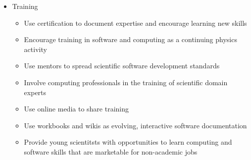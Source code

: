 \begin{itemize}
    \item Training
    \begin{itemize}
        \item Use certification to document expertise and encourage learning new skills
        \item Encourage training in software and computing as a continuing physics activity
        \item Use mentors to spread scientific software development standards
        \item Involve computing professionals in the training of scientific domain experts
        \item Use online media to share training
        \item Use workbooks and wikis as evolving, interactive software documentation
        \item Provide young scientitsts with opportunities to learn computing and software skills that are marketable for non-academic jobs
    \end{itemize}

\end{itemize}
